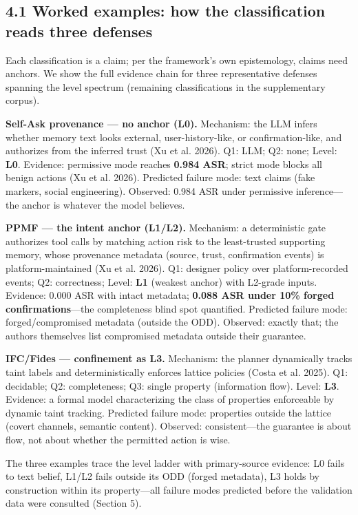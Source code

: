 \documentclass[11pt]{article}
\begin{document}
\subsection{4.1 Worked examples: how the classification reads three defenses}\label{worked-examples-how-the-classification-reads-three-defenses}

Each classification is a claim; per the framework's own epistemology, claims need anchors. We show the full evidence chain for three representative defenses spanning the level spectrum (remaining classifications in the supplementary corpus).

\textbf{Self-Ask provenance --- no anchor (L0).} Mechanism: the LLM infers whether memory text looks external, user-history-like, or confirmation-like, and authorizes from the inferred trust (Xu et al. 2026). Q1: LLM; Q2: none; Level: \textbf{L0}. Evidence: permissive mode reaches \textbf{0.984 ASR}; strict mode blocks all benign actions (Xu et al. 2026). Predicted failure mode: text claims (fake markers, social engineering). Observed: 0.984 ASR under permissive inference---the anchor is whatever the model believes.

\textbf{PPMF --- the intent anchor (L1/L2).} Mechanism: a deterministic gate authorizes tool calls by matching action risk to the least-trusted supporting memory, whose provenance metadata (source, trust, confirmation events) is platform-maintained (Xu et al. 2026). Q1: designer policy over platform-recorded events; Q2: correctness; Level: \textbf{L1} (weakest anchor) with L2-grade inputs. Evidence: 0.000 ASR with intact metadata; \textbf{0.088 ASR under 10\% forged confirmations}---the completeness blind spot quantified. Predicted failure mode: forged/compromised metadata (outside the ODD). Observed: exactly that; the authors themselves list compromised metadata outside their guarantee.

\textbf{IFC/Fides --- confinement as L3.} Mechanism: the planner dynamically tracks taint labels and deterministically enforces lattice policies ({Costa et al.} 2025). Q1: decidable; Q2: completeness; Q3: single property (information flow). Level: \textbf{L3}. Evidence: a formal model characterizing the class of properties enforceable by dynamic taint tracking. Predicted failure mode: properties outside the lattice (covert channels, semantic content). Observed: consistent---the guarantee is about flow, not about whether the permitted action is wise.

The three examples trace the level ladder with primary-source evidence: L0 fails to text belief, L1/L2 fails outside its ODD (forged metadata), L3 holds by construction within its property---all failure modes predicted before the validation data were consulted (Section 5).
\end{document}
